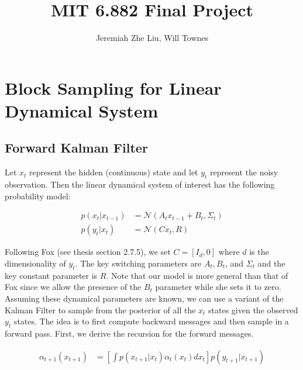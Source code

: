 \documentclass[12pt]{article}
\begin{document}
\title{MIT 6.882 Final Project}
\author{Jeremiah Zhe Liu,  Will Townes}
\maketitle

\section{Block Sampling for Linear Dynamical System}
\subsection{Forward Kalman Filter}
Let $x_t$ represent the hidden (continuous) state and let $y_t$ represent the noisy observation. Then the linear dynamical system of interest has the following probability model:

\begin{align*}
p(x_t|x_{t-1}) &= \mathcal{N}(A_t x_{t-1}+B_t,\Sigma_t)\\
p(y_t|x_t) &= \mathcal{N}(C x_t,R)
\end{align*}

Following Fox (see thesis section 2.7.5), we set $C = [I_d,0]$ where $d$ is the dimensionality of $y_t$. The key switching parameters are $A_t, B_t$, and $\Sigma_t$ and the key constant parameter is $R$. Note that our model is more general than that of Fox since we allow the presence of the $B_t$ parameter while she sets it to zero. Assuming these dynamical parameters are known, we can use a variant of the Kalman Filter to sample from the posterior of all the $x_t$ states given the observed $y_t$ states. The idea is to first compute backward messages and then sample in a forward pass. First, we derive the recursion for the forward messages.

\begin{align*}
\alpha_{t+1}(x_{t+1}) &= \left[\int p(x_{t+1}|x_t)\alpha_t(x_t)dx_t\right] p(y_{t+1}|x_{t+1})
\end{align*}
\end{document}
